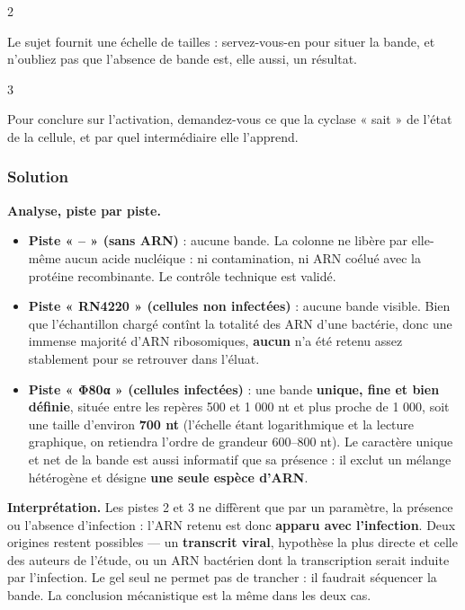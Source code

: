\documentclass[11pt,a4paper]{article}
\providecommand{\tightlist}{\setlength{\itemsep}{0pt}\setlength{\parskip}{0pt}}
\begin{document}
\begin{indication}{2}

Le sujet fournit une échelle de tailles : servez-vous-en pour situer la bande, et n'oubliez pas que l'absence de bande est, elle aussi, un résultat.

\end{indication}

\begin{indication}{3}

Pour conclure sur l'activation, demandez-vous ce que la cyclase « sait » de l'état de la cellule, et par quel intermédiaire elle l'apprend.

\end{indication}

\hypertarget{solution-17}{%
\subsubsection{Solution}\label{solution-17}}

\textbf{Analyse, piste par piste.}

\begin{itemize}
\tightlist
\item
  \textbf{Piste « -- » (sans ARN)} : aucune bande. La colonne ne libère par elle-même aucun acide nucléique : ni contamination, ni ARN coélué avec la protéine recombinante. Le contrôle technique est validé.
\item
  \textbf{Piste « RN4220 » (cellules non infectées)} : aucune bande visible. Bien que l'échantillon chargé contînt la totalité des ARN d'une bactérie, donc une immense majorité d'ARN ribosomiques, \textbf{aucun} n'a été retenu assez stablement pour se retrouver dans l'éluat.
\item
  \textbf{Piste « Φ80α » (cellules infectées)} : une bande \textbf{unique, fine et bien définie}, située entre les repères 500 et 1 000 nt et plus proche de 1 000, soit une taille d'environ \textbf{700 nt} (l'échelle étant logarithmique et la lecture graphique, on retiendra l'ordre de grandeur 600--800 nt). Le caractère unique et net de la bande est aussi informatif que sa présence : il exclut un mélange hétérogène et désigne \textbf{une seule espèce d'ARN}.
\end{itemize}

\textbf{Interprétation.} Les pistes 2 et 3 ne diffèrent que par un paramètre, la présence ou l'absence d'infection : l'ARN retenu est donc \textbf{apparu avec l'infection}. Deux origines restent possibles --- un \textbf{transcrit viral}, hypothèse la plus directe et celle des auteurs de l'étude, ou un ARN bactérien dont la transcription serait induite par l'infection. Le gel seul ne permet pas de trancher : il faudrait séquencer la bande. La conclusion mécanistique est la même dans les deux cas.
\end{document}
